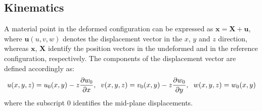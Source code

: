 \documentclass[journal]{new-aiaa}
\begin{document}
\subsection{Kinematics}
A material point in the deformed configuration can be expressed as $\textbf{x} = \textbf{X} + \textbf{u}$, where $\textbf{u} (u, v, w)$ denotes the displacement vector in the $x$, $y$ and $z$ direction, whereas $\textbf{x}$, $\textbf{X}$ identify the position vectors in the undeformed and in the reference configuration, respectively. The components of the displacement vector are defined accordingly as:
\begin{equation}
\label{disp}
u(x,y,z)  = u_{0}(x,y)  -  z \frac{\partial w_{0}}{\partial x},  \hspace {0.2cm}
v(x,y,z)  = v_{0}(x,y)  -  z \frac{\partial w_{0}}{\partial y} ,  \hspace {0.2cm}
w(x,y,z)  = w_{0}(x,y)
\end{equation}
where the subscript $0$ identifies the mid-plane displacements. 
\end{document}
